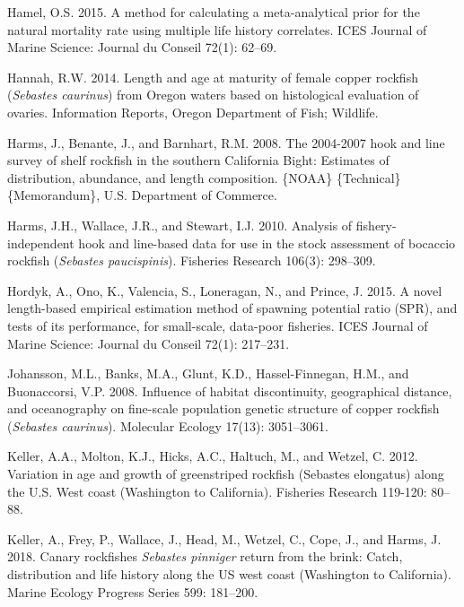 \documentclass[11pt,
  english,
  a4paper,
]{article}
\newlength{\cslhangindent}
\newenvironment{CSLReferences}[2] %
 {%
  \setlength{\parindent}{0pt}
  \ifodd #1 \everypar{\setlength{\hangindent}{\cslhangindent}}\ignorespaces\fi
  \ifnum #2 > 0
  \setlength{\parskip}{#2\baselineskip}
  \fi
 }%
 {}
\begin{document}
\begin{CSLReferences}{1}{0}
\leavevmode{}%
Hamel, O.S. 2015. A method for calculating a meta-analytical prior for the natural mortality rate using multiple life history correlates. ICES Journal of Marine Science: Journal du Conseil 72(1): 62--69.

\leavevmode{}%
Hannah, R.W. 2014. Length and age at maturity of female copper rockfish (\emph{{Sebastes} caurinus}) from {Oregon} waters based on histological evaluation of ovaries. Information Reports, Oregon Department of Fish; Wildlife.

\leavevmode{}%
Harms, J., Benante, J., and Barnhart, R.M. 2008. {The} 2004-2007 hook and line survey of shelf rockfish in the southern {California} {Bight}: {Estimates} of distribution, abundance, and length composition. \{NOAA\} \{Technical\} \{Memorandum\}, U.S. Department of Commerce.

\leavevmode{}%
Harms, J.H., Wallace, J.R., and Stewart, I.J. 2010. Analysis of fishery-independent hook and line-based data for use in the stock assessment of bocaccio rockfish (\emph{{Sebastes} paucispinis}). Fisheries Research 106(3): 298--309.

\leavevmode{}%
Hordyk, A., Ono, K., Valencia, S., Loneragan, N., and Prince, J. 2015. A novel length-based empirical estimation method of spawning potential ratio ({SPR}), and tests of its performance, for small-scale, data-poor fisheries. ICES Journal of Marine Science: Journal du Conseil 72(1): 217--231.

\leavevmode{}%
Johansson, M.L., Banks, M.A., Glunt, K.D., Hassel-Finnegan, H.M., and Buonaccorsi, V.P. 2008. Influence of habitat discontinuity, geographical distance, and oceanography on fine-scale population genetic structure of copper rockfish (\emph{{Sebastes} caurinus}). Molecular Ecology 17(13): 3051--3061.

\leavevmode{}%
Keller, A.A., Molton, K.J., Hicks, A.C., Haltuch, M., and Wetzel, C. 2012. Variation in age and growth of greenstriped rockfish ({Sebastes} elongatus) along the {U}.{S}. West coast ({Washington} to {California}). Fisheries Research 119-120: 80--88.

\leavevmode{}%
Keller, A., Frey, P., Wallace, J., Head, M., Wetzel, C., Cope, J., and Harms, J. 2018. Canary rockfishes \emph{{Sebastes} pinniger} return from the brink: Catch, distribution and life history along the {US} west coast ({Washington} to {California}). Marine Ecology Progress Series 599: 181--200.


\end{CSLReferences}
\end{document}
